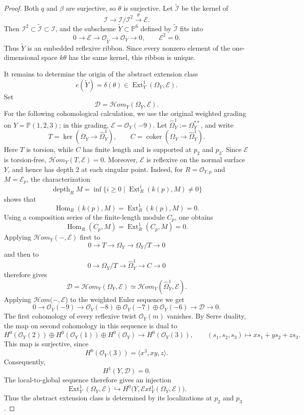 \documentclass[11pt,twoside]{amsart}
\theoremstyle{plain}
\numberwithin{equation}{section}
\theoremstyle{definition}
\begin{document}
\begin{proof}
Both $q$ and $\beta$ are surjective, so $\theta$ is surjective. Let $\widetilde{\mathcal I}$ be the kernel of
$$
\mathcal I\longrightarrow\mathcal I/\mathcal I^2
\xrightarrow{\ \theta\ }\mathcal E.
$$
Then $\mathcal I^2\subset\widetilde{\mathcal I}\subset\mathcal I$, and the subscheme $\widetilde Y\subset\mathbb P^6$ defined by $\widetilde{\mathcal I}$ fits into
$$
0\longrightarrow\mathcal E
\longrightarrow\mathcal O_{\widetilde Y}
\longrightarrow\mathcal O_Y
\longrightarrow0,
\qquad
\mathcal E^2=0.
$$
Thus $\widetilde Y$ is an embedded reflexive ribbon. Since every nonzero element of the one-dimensional space $k\theta$ has the same kernel, this ribbon is unique.

It remains to determine the origin of the abstract extension class
$$
e(\widetilde Y)=\delta(\theta)
\in \operatorname{Ext}^1_Y(\Omega_Y,\mathcal E).
$$
Set
$$
\mathcal D=\mathcal H om_Y(\Omega_Y,\mathcal E).
$$
For the following cohomological calculation, we use the original weighted grading on $Y=\mathbb P(1,2,3)$; in this grading, $\mathcal E=\mathcal O_Y(-9)$. Let $\widehat\Omega_Y^1:=\Omega_Y^{**}$, and write
$$
T=\ker(\Omega_Y\longrightarrow\widehat\Omega_Y^1),
\qquad
C=\operatorname{coker}(\Omega_Y\longrightarrow\widehat\Omega_Y^1).
$$
Here $T$ is torsion, while $C$ has finite length and is supported at $p_2$ and $p_3$. Since $\mathcal E$ is torsion-free, $\mathcal H om_Y(T,\mathcal E)=0$. Moreover, $\mathcal E$ is reflexive on the normal surface $Y$, and hence has depth $2$ at each singular point. Indeed, for $R=\mathcal O_{Y,p}$ and $M=\mathcal E_p$, the characterization
$$
\operatorname{depth}_R M
=
\inf\bigl\{i\geq 0\mid
\operatorname{Ext}^i_R(k(p),M)\neq0\bigr\}
$$
shows that
$$
\operatorname{Hom}_R(k(p),M)
=
\operatorname{Ext}^1_R(k(p),M)=0.
$$
Using a composition series of the finite-length module $C_p$, one obtains
$$
\operatorname{Hom}_R(C_p,M)
=
\operatorname{Ext}^1_R(C_p,M)=0.
$$
Applying $\mathcal H om_Y(-,\mathcal E)$ first to
$$
0\longrightarrow T\longrightarrow\Omega_Y
\longrightarrow\Omega_Y/T\longrightarrow0
$$
and then to
$$
0\longrightarrow\Omega_Y/T
\longrightarrow\widehat\Omega_Y^1
\longrightarrow C\longrightarrow0
$$
therefore gives
$$
\mathcal D=\mathcal H om_Y(\Omega_Y,\mathcal E)
\simeq
\mathcal H om_Y(\widehat\Omega_Y^1,\mathcal E).
$$ Applying $\mathcal{H}om(-, \mathcal E$) to the  weighted Euler sequence we get
$$
0\longrightarrow\mathcal O_Y(-9)
\longrightarrow
\mathcal O_Y(-8)\oplus\mathcal O_Y(-7)\oplus\mathcal O_Y(-6)
\longrightarrow\mathcal D
\longrightarrow0.
$$
The first cohomology of every reflexive twist $\mathcal O_Y(m)$ vanishes. By Serre duality, the map on second cohomology in this sequence is dual to
$$
H^0(\mathcal O_Y(2))\oplus H^0(\mathcal O_Y(1))
\oplus H^0(\mathcal O_Y)
\longrightarrow H^0(\mathcal O_Y(3)),
\qquad
(s_1,s_2,s_3)\longmapsto xs_1+ys_2+zs_3.
$$
This map is surjective, since
$$
H^0(\mathcal O_Y(3))=\langle x^3,xy,z\rangle.
$$
Consequently,
$$
H^1(Y,\mathcal D)=0.
$$
The local-to-global sequence therefore gives an injection
$$
\operatorname{Ext}^1_Y(\Omega_Y,\mathcal E)
\hookrightarrow
H^0\bigl(Y,\mathcal E xt^1_Y(\Omega_Y,\mathcal E)\bigr).
$$
Thus the abstract extension class is determined by its localizations at $p_2$ and $p_3$.


\end{proof}
\end{document}
